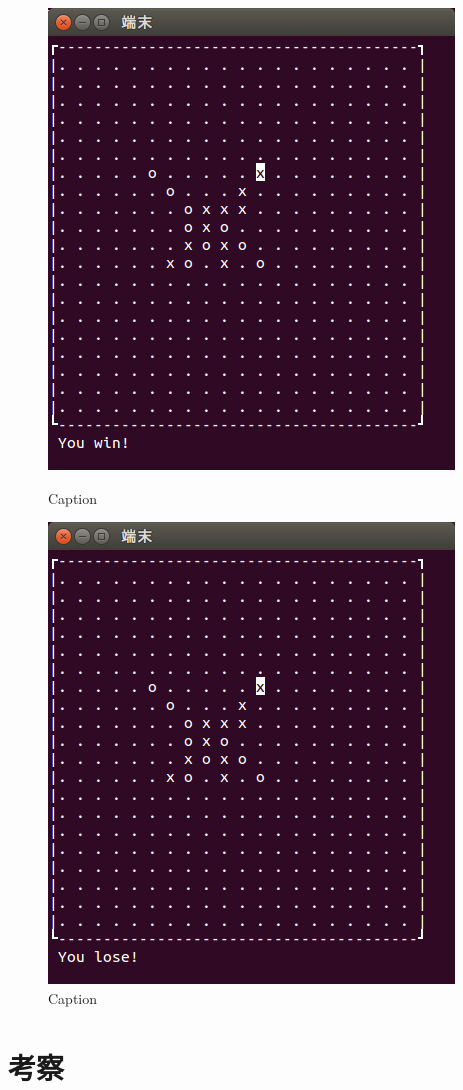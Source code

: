 \documentclass[a4j, titlepage, 10pt]{jsarticle}
\begin{document}
\begin{figure}[H]
  \begin{minipage}{0.5\hsize}
    \centering
    \includegraphics[scale=0.5]{img/fin-1.png}
    \caption{Caption}
    \label{fig:fin-1.png}
  \end{minipage}
  \begin{minipage}{0.5\hsize}
    \includegraphics[scale=0.5]{img/fin-2.png}
    \caption{Caption}
    \label{fig:fin-2.png}
  \end{minipage}
\end{figure}


\section{考察}

\end{document}

